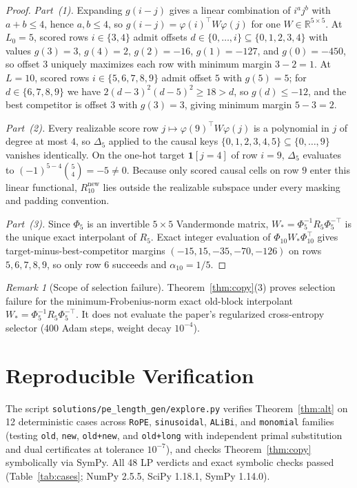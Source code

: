 \documentclass[11pt]{article}
\theoremstyle{plain}
\theoremstyle{definition}
\theoremstyle{remark}
\newtheorem{remark}{Remark}
\begin{document}
\begin{proof}
\emph{Part~(1).} Expanding $g(i - j)$ gives a linear combination of $i^a j^b$ with $a + b \le 4$, hence $a, b \le 4$, so $g(i - j) = \varphi(i)^\top W \varphi(j)$ for one $W \in \mathbb{R}^{5 \times 5}$.
At $L_0 = 5$, scored rows $i \in \{3, 4\}$ admit offsets $d \in \{0, \dots, i\} \subseteq \{0, 1, 2, 3, 4\}$ with values $g(3) = 3$, $g(4) = 2$, $g(2) = -16$, $g(1) = -127$, and $g(0) = -450$, so offset $3$ uniquely maximizes each row with minimum margin $3 - 2 = 1$.
At $L = 10$, scored rows $i \in \{5, 6, 7, 8, 9\}$ admit offset $5$ with $g(5) = 5$; for $d \in \{6, 7, 8, 9\}$ we have $2(d - 3)^2(d - 5)^2 \ge 18 > d$, so $g(d) \le -12$, and the best competitor is offset $3$ with $g(3) = 3$, giving minimum margin $5 - 3 = 2$.

\emph{Part~(2).} Every realizable score row $j \mapsto \varphi(9)^\top W \varphi(j)$ is a polynomial in $j$ of degree at most $4$, so $\Delta_5$ applied to the causal keys $\{0, 1, 2, 3, 4, 5\} \subseteq \{0, \dots, 9\}$ vanishes identically. On the one-hot target $\mathbf{1}[j = 4]$ of row $i = 9$, $\Delta_5$ evaluates to $(-1)^{5 - 4}\binom{5}{4} = -5 \neq 0$. Because only scored causal cells on row $9$ enter this linear functional, $R_{10}^{\mathrm{new}}$ lies outside the realizable subspace under every masking and padding convention.

\emph{Part~(3).} Since $\Phi_5$ is an invertible $5 \times 5$ Vandermonde matrix, $W_* = \Phi_5^{-1} R_5 \Phi_5^{-\top}$ is the unique exact interpolant of $R_5$. Exact integer evaluation of $\Phi_{10} W_* \Phi_{10}^\top$ gives target-minus-best-competitor margins $(-15, 15, -35, -70, -126)$ on rows $5, 6, 7, 8, 9$, so only row $6$ succeeds and $\alpha_{10} = 1/5$.
\end{proof}

\begin{remark}[Scope of selection failure]
Theorem~\ref{thm:copy}(3) proves selection failure for the minimum-Frobenius-norm exact old-block interpolant $W_* = \Phi_5^{-1} R_5 \Phi_5^{-\top}$. It does not evaluate the paper's regularized cross-entropy selector (400 Adam steps, weight decay $10^{-4}$).
\end{remark}

\section{Reproducible Verification}

The script \texttt{solutions/pe\_length\_gen/explore.py} verifies Theorem~\ref{thm:alt} on 12 deterministic cases across \texttt{RoPE}, \texttt{sinusoidal}, \texttt{ALiBi}, and \texttt{monomial} families (testing \texttt{old}, \texttt{new}, \texttt{old+new}, and \texttt{old+long} with independent primal substitution and dual certificates at tolerance $10^{-7}$), and checks Theorem~\ref{thm:copy} symbolically via SymPy. All 48 LP verdicts and exact symbolic checks passed (Table~\ref{tab:cases}; NumPy 2.5.5, SciPy 1.18.1, SymPy 1.14.0).
\end{document}
